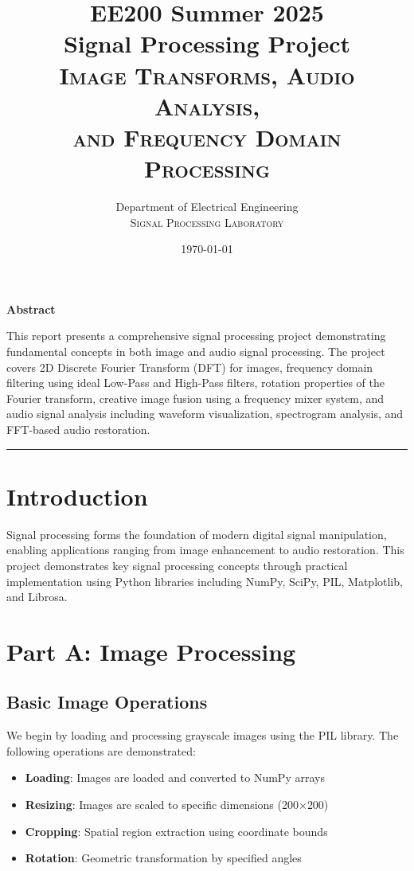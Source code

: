 \documentclass[12pt,a4paper]{article}
\title{\textbf{EE200 Summer 2025}\\\bigskip
Signal Processing Project\\
\textsc{Image Transforms, Audio Analysis,\\and Frequency Domain Processing}}
\author{Department of Electrical Engineering\\\bigskip
\textsc{Signal Processing Laboratory}}
\date{\today}
\begin{document}
\maketitle
\thispagestyle{empty}
\vspace{2em}

\begin{center}
\textbf{Abstract}
\end{center}
\parbox{0.9\textwidth}{
This report presents a comprehensive signal processing project demonstrating fundamental concepts in both image and audio signal processing. The project covers 2D Discrete Fourier Transform (DFT) for images, frequency domain filtering using ideal Low-Pass and High-Pass filters, rotation properties of the Fourier transform, creative image fusion using a frequency mixer system, and audio signal analysis including waveform visualization, spectrogram analysis, and FFT-based audio restoration.}
\bigskip

\hrule
\bigskip

\section{Introduction}
Signal processing forms the foundation of modern digital signal manipulation, enabling applications ranging from image enhancement to audio restoration. This project demonstrates key signal processing concepts through practical implementation using Python libraries including NumPy, SciPy, PIL, Matplotlib, and Librosa.

\bigskip
\section{Part A: Image Processing}

\subsection{Basic Image Operations}
We begin by loading and processing grayscale images using the PIL library. The following operations are demonstrated:

\begin{itemize}
    \item \textbf{Loading}: Images are loaded and converted to NumPy arrays
    \item \textbf{Resizing}: Images are scaled to specific dimensions (200$\times$200)
    \item \textbf{Cropping}: Spatial region extraction using coordinate bounds
    \item \textbf{Rotation}: Geometric transformation by specified angles
\end{itemize}
\end{document}
